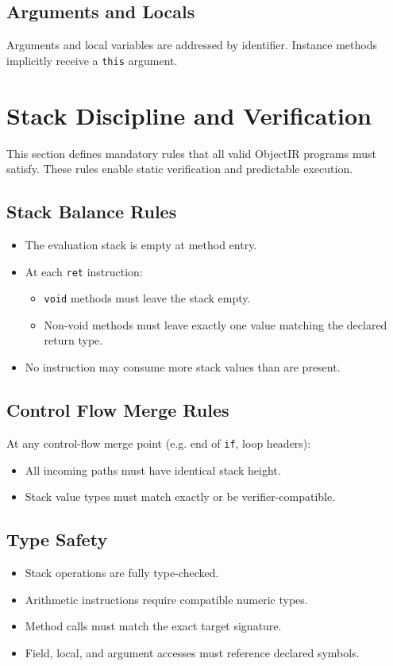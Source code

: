 \documentclass[11pt,a4paper]{article}
\begin{document}
	\subsection{Arguments and Locals}
	Arguments and local variables are addressed by identifier. Instance methods implicitly receive a \texttt{this} argument.
	
	\section{Stack Discipline and Verification}
	
	This section defines mandatory rules that all valid ObjectIR programs must satisfy. These rules enable static verification and predictable execution.
	
	\subsection{Stack Balance Rules}
	\begin{itemize}
		\item The evaluation stack is empty at method entry.
		\item At each \texttt{ret} instruction:
		\begin{itemize}
			\item \texttt{void} methods must leave the stack empty.
			\item Non-void methods must leave exactly one value matching the declared return type.
		\end{itemize}
		\item No instruction may consume more stack values than are present.
	\end{itemize}
	
	\subsection{Control Flow Merge Rules}
	At any control-flow merge point (e.g. end of \texttt{if}, loop headers):
	\begin{itemize}
		\item All incoming paths must have identical stack height.
		\item Stack value types must match exactly or be verifier-compatible.
	\end{itemize}
	
	\subsection{Type Safety}
	\begin{itemize}
		\item Stack operations are fully type-checked.
		\item Arithmetic instructions require compatible numeric types.
		\item Method calls must match the exact target signature.
		\item Field, local, and argument accesses must reference declared symbols.
	\end{itemize}
	
\end{document}

